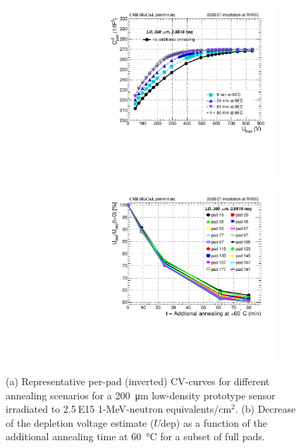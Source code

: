 \begin{figure}
	\captionsetup[subfigure]{aboveskip=-1pt,belowskip=-1pt}
	\centering
	\begin{subfigure}[b]{0.49\textwidth}
		\includegraphics[width=0.999\textwidth]{plots/annealing_Vdep/annealing_cv_ch24.pdf}
		\subcaption{
		}
		\label{plot:annealing_CV}
	\end{subfigure}
	\hfill
	\begin{subfigure}[b]{0.49\textwidth}
		\includegraphics[width=0.999\textwidth]{plots/annealing_Vdep/annealing_Vdep.pdf}
		\subcaption{
		}
		\label{plot:annealing_Vdep}
	\end{subfigure}
	\caption{
		(a) Representative per-pad (inverted) CV-curves for different annealing scenarios for a \SI{200}{\micro\metre} low-density prototype sensor irradiated to 2.5$~$E15 1-MeV-neutron equivalents/cm$^{2}$.
        (b) Decrease of the depletion voltage estimate ($U\text{dep}$) as a function of the additional annealing time at \SI{60}{\celsius} for a subset of full pads.
	}
\end{figure}